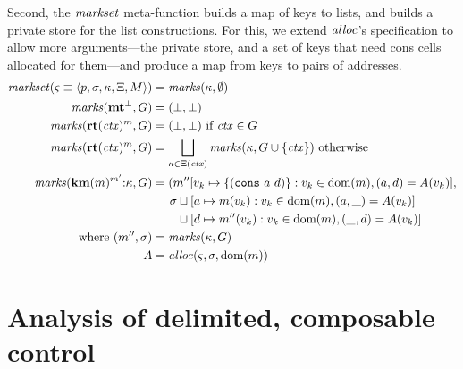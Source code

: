 {Second, the $\mathit{markset}$ meta-function builds a map of keys to lists, and builds a private store for the list constructions.
%
For this, we extend $\mathit{alloc}$'s specification to allow more arguments---the private store, and a set of keys that need cons cells allocated for them---and produce a map from keys to pairs of addresses.
%
\newcommand{\markaux}{\mathit{marks}}
\begin{align*}
  \domarkset(\mstate\equiv\tpl{\mpoint,\mstore,\mkont,\mktab,\mmemo}) &= \markaux(\mkont,\emptyset) \\
  \markaux(\kmt^\bot, G) &= (\bot, \bot) \\
  \markaux(\krt{\mctx}^\mmarks, G) &= (\bot, \bot) \text{ if } \mctx \in G \\ %
  \markaux(\krt{\mctx}^\mmarks, G) &= \bigsqcup\limits_{\mkont\in \mktab(\mctx)}{\markaux(\mkont,G \cup \set{\mctx})} \text{ otherwise} \\
  \markaux(\kcons{\kwcm{\mmarks}^{\mmarks'}}{\mkont}, G) &= (\mmarks''[\mval_k \mapsto \set{\cons{a}{d}} : \mval_k \in \dom(\mmarks), (a, d) = A(\mval_k)], \\
    &\phantom{= (}
      \mstore\sqcup[a \mapsto \mmarks(\mval_k) : \mval_k \in \dom(\mmarks), (a,\_) = A(\mval_k)] \\
    &\phantom{= (\mstore}\sqcup[d \mapsto \mmarks''(\mval_k) : \mval_k \in \dom(\mmarks), (\_,d) = A(\mval_k)]
   \\ \text{where } (\mmarks'', \mstore) &= \markaux(\mkont, G)
   \\ A &= \alloc(\mstate, \mstore, \dom(\mmarks))
\end{align*}
}

\section{Analysis of delimited, composable control}
\label{sec:sr}


